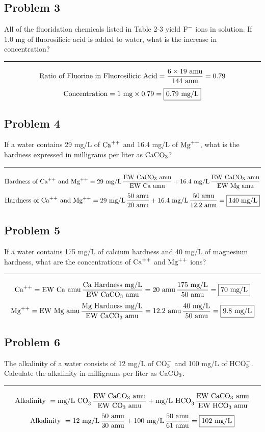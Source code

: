 \subsection*{Problem 3}
All of the fluoridation chemicals listed in Table 2-3 yield \(\textnormal{F}^-\) ions in solution. If 1.0 mg of fluorosilicic acid is added to water, what is the increase in concentration?\\
\rule{5cm}{1pt}
\[\textnormal{Ratio of Fluorine in Fluorosilicic Acid}=\frac{6\times 19\textnormal{ amu}}{144\textnormal{ amu}}=0.79\]
\[\textnormal{Concentration}=1\textnormal{ mg}\times 0.79=\boxed{0.79 \textnormal{ mg/L}}\]
\subsection*{Problem 4}
If a water contains 29 mg/L of \(\textnormal{Ca}^{++}\) and 16.4 mg/L of \(\textnormal{Mg}^{++}\), what is the hardness expressed in milligrams per liter as CaC\(\textnormal{O}_3\)?\\
\rule{5cm}{1pt}
\[\textnormal{Hardness of }\textnormal{Ca}^{++}\textnormal{ and Mg}^{++}=29\textnormal{ mg/L}\,\frac{\textnormal{EW CaCO}_3\textnormal{ amu}}{\textnormal{EW Ca amu}}+16.4\textnormal{ mg/L}\,\frac{\textnormal{EW CaCO}_3\textnormal{ amu}}{\textnormal{EW Mg amu}}\]
\[\textnormal{Hardness of }\textnormal{Ca}^{++}\textnormal{ and Mg}^{++}=29\textnormal{ mg/L}\,\frac{50\textnormal{ amu}}{20\textnormal{ amu}}+16.4\textnormal{ mg/L}\,\frac{50\textnormal{ amu}}{12.2\textnormal{ amu}}=\boxed{140\textnormal{ mg/L}}\]
\subsection*{Problem 5}
If a water contains 175 mg/L of calcium hardness and 40 mg/L of magnesium hardness, what are the concentrations of \(\textnormal{Ca}^{++}\) and \(\textnormal{Mg}^{++}\) ions?\\
\rule{5cm}{1pt}
\[\textnormal{Ca}^{++}=\textnormal{EW Ca amu}\,\frac{\textnormal{Ca Hardness mg/L}}{\textnormal{EW CaCO}_3\textnormal{ amu}}=20\textnormal{ amu}\,\frac{175\textnormal{ mg/L}}{50\textnormal{ amu}}=\boxed{70 \textnormal{ mg/L}}\]
\[\textnormal{Mg}^{++}=\textnormal{EW Mg amu}\,\frac{\textnormal{Mg Hardness mg/L}}{\textnormal{EW CaCO}_3\textnormal{ amu}}=12.2\textnormal{ amu}\,\frac{40\textnormal{ mg/L}}{50\textnormal{ amu}}=\boxed{9.8 \textnormal{ mg/L}}\]
\subsection*{Problem 6}
The alkalinity of a water consists of 12 mg/L of C\(\textnormal{O}_3^-\) and 100 mg/L of HC\(\textnormal{O}_3^-\). Calculate the alkalinity in milligrams per liter as CaC\(\textnormal{O}_3\).\\
\rule{5cm}{1pt}
\[\textnormal{Alkalinity }=\textnormal{mg/L CO}_3\,\frac{\textnormal{EW CaCO}_3\textnormal{ amu}}{\textnormal{EW CO}_3\textnormal{ amu}}+\textnormal{mg/L HCO}_3\,\frac{\textnormal{EW CaCO}_3\textnormal{ amu}}{\textnormal{EW HCO}_3\textnormal{ amu}}\]
\[\textnormal{Alkalinity }=12\textnormal{ mg/L}\,\frac{50\textnormal{ amu}}{30\textnormal{ amu}}+100\textnormal{ mg/L}\,\frac{50\textnormal{ amu}}{61\textnormal{ amu}}=\boxed{102\textnormal{ mg/L}}\]
\newpage
